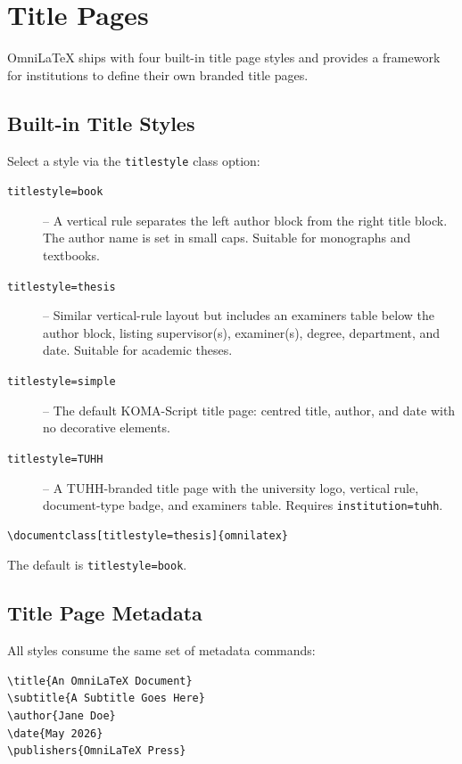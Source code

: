 \chapter{Title Pages}
\label{ch:title-pages}

OmniLaTeX ships with four built-in title page styles and provides a
framework for institutions to define their own branded title pages.

\section{Built-in Title Styles}

Select a style via the \texttt{titlestyle} class option:

\begin{description}
  \item[{\texttt{titlestyle=book}}] -- A vertical rule separates the left
        author block from the right title block.  The author name is set in
        small caps.  Suitable for monographs and textbooks.
  \item[{\texttt{titlestyle=thesis}}] -- Similar vertical-rule layout but
        includes an examiners table below the author block, listing
        supervisor(s), examiner(s), degree, department, and date.
        Suitable for academic theses.
  \item[{\texttt{titlestyle=simple}}] -- The default KOMA-Script title page:
        centred title, author, and date with no decorative elements.
  \item[{\texttt{titlestyle=TUHH}}] -- A TUHH-branded title page with the
        university logo, vertical rule, document-type badge, and examiners
        table.  Requires \texttt{institution=tuhh}.
\end{description}

\begin{verbatim}
\documentclass[titlestyle=thesis]{omnilatex}
\end{verbatim}

The default is \texttt{titlestyle=book}.

\section{Title Page Metadata}

All styles consume the same set of metadata commands:

\begin{verbatim}
\title{An OmniLaTeX Document}
\subtitle{A Subtitle Goes Here}
\author{Jane Doe}
\date{May 2026}
\publishers{OmniLaTeX Press}
\end{verbatim}

